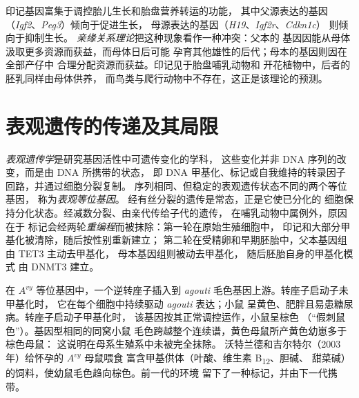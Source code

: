\begin{remark}[为何需要印记]\label{rem:b3:chromatin-epigenetics:kinship}
印记基因富集于调控胎儿生长和胎盘营养转运的功能，
其中父源表达的基因（\emph{Igf2}、\emph{Peg3}）倾向于促进生长，
母源表达的基因（\emph{H19}、\emph{Igf2r}、\emph{Cdkn1c}）
则倾向于抑制生长。
\emph{亲缘关系理论}把这种现象看作一种冲突：父本的
基因因能从母体汲取更多资源而获益，而母体日后可能
孕育其他雄性的后代；母本的基因则因在全部产仔中
合理分配资源而获益。印记见于胎盘哺乳动物和
开花植物中，后者的胚乳同样由母体供养，
而鸟类与爬行动物中不存在，这正是该理论的预测。
\end{remark}

\section{表观遗传的传递及其局限}

\begin{definition}[表观遗传学]\label{def:b3:chromatin-epigenetics:epigenetics}
\emph{表观遗传学}是研究基因活性中可遗传变化的学科，
这些变化并非 DNA 序列的改变，而是由 DNA 所携带的状态，
即 DNA 甲基化、标记或自我维持的转录因子回路，并通过细胞分裂复制。
序列相同、但稳定的表观遗传状态不同的两个等位基因，
称为\emph{表观等位基因}。
经有丝分裂的遗传是常态，正是它使已分化的
细胞保持分化状态。经减数分裂、由亲代传给子代的遗传，
在哺乳动物中属例外，原因在于
标记会经两轮\emph{重编程}而被抹除：第一轮在原始生殖细胞中，
印记和大部分甲基化被清除，随后按性别重新建立；
第二轮在受精卵和早期胚胎中，父本基因组由 TET3 主动去甲基化，
母本基因组则被动去甲基化，
随后胚胎自身的甲基化模式
由 DNMT3 建立。
\end{definition}

\begin{example}\label{ex:b3:chromatin-epigenetics:agouti}
在 $A^{vy}$ 等位基因中，一个逆转座子插入到
\emph{agouti} 毛色基因上游。转座子启动子未甲基化时，
它在每个细胞中持续驱动 \emph{agouti} 表达；小鼠
呈黄色、肥胖且易患糖尿病。转座子启动子甲基化时，
该基因按其正常调控运作，小鼠呈棕色
（“假刺鼠色”）。基因型相同的同窝小鼠
毛色跨越整个连续谱，黄色母鼠所产黄色幼崽多于棕色母鼠：
这说明在母系生殖系中未被完全抹除。
沃特兰德和吉尔特尔（2003 年）给怀孕的 $A^{vy}$ 母鼠喂食
富含甲基供体（叶酸、维生素 B\textsubscript{12}、胆碱、
甜菜碱）的饲料，使幼鼠毛色趋向棕色。前一代的环境
留下了一种标记，并由下一代携带。
\end{example}

